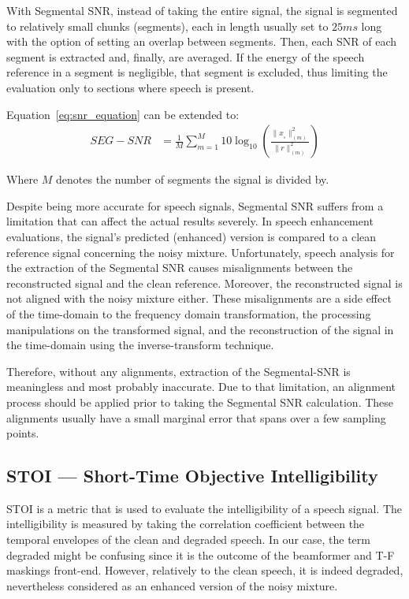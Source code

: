 With Segmental SNR\cite{10.5555/912256}, instead of taking the entire signal,
the signal is segmented to relatively small chunks (segments), 
each in length usually set to \(25ms\) long
with the option of setting an overlap
between segments.
Then, each SNR of each segment is extracted and, finally,
are averaged. 
If the energy of the speech reference 
in a segment is negligible, that segment is excluded,
thus limiting the evaluation only to sections 
where speech is present. 


Equation~\ref{eq:snr_equation} can be extended to:
\begin{align}
    SEG-SNR & = \frac{1}{M}\sum_{m=1}^{M}
                10\log_{10} 
                \left(
                    \frac{ \| x_{_{s}} \|^{2}_{(m)}}{\| r \|^{2}_{(m)}} 
                \right)
\end{align}

Where \(M\) denotes the number of segments the signal is divided by.


Despite being more accurate for speech signals, Segmental SNR 
suffers from a limitation that can affect the actual results severely. 
In speech enhancement evaluations, the signal's predicted (enhanced) version is 
compared to a clean reference signal 
concerning the noisy mixture.
Unfortunately, speech analysis for the extraction of
the Segmental SNR causes misalignments between 
the reconstructed signal and the clean reference. 
Moreover, the reconstructed signal is not aligned 
with the noisy mixture either. 
These misalignments 
are a side effect of the time-domain 
to the frequency domain transformation, 
the processing manipulations on the transformed signal, 
and the reconstruction of the signal in 
the time-domain using the inverse-transform technique. 

Therefore, without any alignments, extraction of the Segmental-SNR
is meaningless and most probably inaccurate. 
Due to that limitation, an alignment process should be applied
prior to taking the Segmental SNR calculation. These alignments usually 
have a small marginal error that spans over a few sampling points.

\subsection{STOI --- Short-Time Objective Intelligibility}
STOI\cite{5495701} is a metric that is used to evaluate 
the intelligibility of a speech signal.
The intelligibility is measured by taking the correlation
coefficient between the temporal envelopes of the clean
and degraded speech. In our case, the term degraded might
be confusing since it is the outcome of the beamformer
and T-F maskings front-end. However, relatively to the clean
speech, it is indeed degraded, nevertheless
considered as an enhanced version of the noisy mixture.

